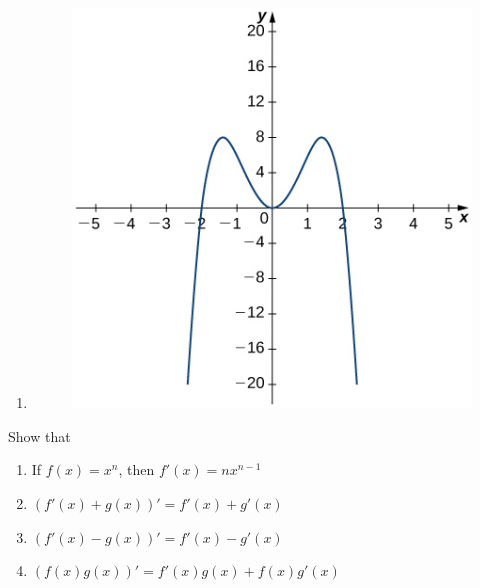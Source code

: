 \documentclass[12pt]{amsart}
\begin{document}
\begin{question}
\begin{enumerate}
		\item
		      \begin{figure}[h!]
			      \includegraphics{figures/3.jpeg}
		      \end{figure}
	\end{enumerate}
\end{question}


\begin{question}
	Show that
	\begin{enumerate}
		\item If $\displaystyle f(x) = x^n$, then $f'(x) = n x^{n-1}$
		      \vspace{5cm}
		\item $ (f'(x) + g(x))' = f'(x) + g'(x)$
		      \vspace{5cm}
		\item $ (f'(x) - g(x))' = f'(x) - g'(x)$
		      \vspace{5cm}
		\item  $\displaystyle (f(x)g(x))'  = f'(x) g(x) + f(x) g'(x)$
		      \vspace{5cm}
	\end{enumerate}
\end{question}


\printbibliography
\end{document}
